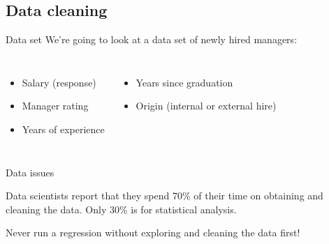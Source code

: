 \documentclass{beamer}\usepackage[]{graphicx}\usepackage[]{color}
\makeatletter
\def\maxwidth{ %
  \ifdim\Gin@nat@width>\linewidth
    \linewidth
  \else
    \Gin@nat@width
  \fi
}
\newcommand{\hlstr}[1]{\textcolor[rgb]{1,0.894,0.71}{#1}}%
\newcommand{\hlopt}[1]{\textcolor[rgb]{1,0.894,0.769}{#1}}%
\newcommand{\hlstd}[1]{\textcolor[rgb]{1,0.894,0.769}{#1}}%
\newcommand{\hlkwc}[1]{\textcolor[rgb]{0.78,0.941,0.545}{#1}}%
\newcommand{\hlkwd}[1]{\textcolor[rgb]{1,0.78,0.769}{#1}}%
\newenvironment{kframe}{%
 \def\at@end@of@kframe{}%
 \ifinner\ifhmode%
  \def\at@end@of@kframe{\end{minipage}}%
  \begin{minipage}{\columnwidth}%
 \fi\fi%
 \def\FrameCommand##1{\hskip\@totalleftmargin \hskip-\fboxsep
 \colorbox{shadecolor}{##1}\hskip-\fboxsep
     \hskip-\linewidth \hskip-\@totalleftmargin \hskip\columnwidth}%
 \MakeFramed {\advance\hsize-\width
   \@totalleftmargin\z@ \linewidth\hsize
   \@setminipage}}%
 {\par\unskip\endMakeFramed%
 \at@end@of@kframe}
\newenvironment{knitrout}{}{} %
\makeatother
\begin{document}
\begin{darkframes}
    \section{Data cleaning}

    \begin{frame}{Data set}
      We're going to look at a data set of newly hired managers:
      \begin{columns}[onlytextwidth]
          \begin{itemize}
            \item Salary (response)
            \item Manager rating
            \item Years of experience
          \end{itemize}
          \begin{itemize}
            \item Years since graduation
            \item Origin (internal or external hire)
          \end{itemize}
      \end{columns}
    \end{frame}

    \begin{frame}[fragile]{Data issues}
      \begin{center}
        Data scientists report that they spend \alert{70\% of their time on obtaining and cleaning the data}. Only 30\% is for statistical analysis.\bigskip \pause

        Never run a regression without exploring and cleaning the data first!
      \end{center}
    \end{frame}

\end{darkframes}
\end{document}
